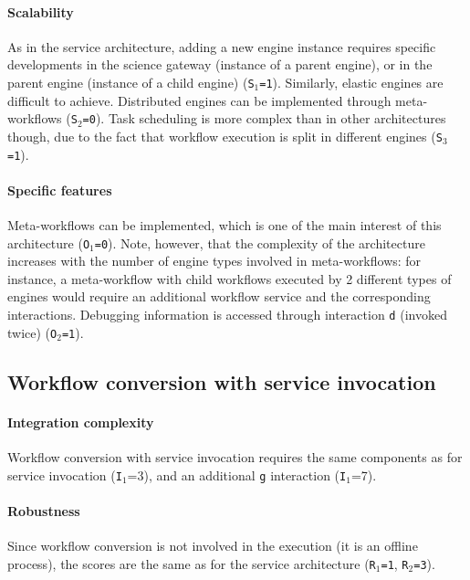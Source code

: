 \documentclass[preprint,3p,twocolumn]{elsarticle}
\begin{document}
\paragraph{Scalability} As in the service architecture, adding a new
engine instance requires specific developments in the science gateway
(instance of a parent engine), or in the parent engine (instance of a
child engine) (\texttt{S$_1$=1}). Similarly, elastic engines are
difficult to achieve. Distributed engines can be implemented through meta-workflows (\texttt{S$_2$=0}). Task scheduling
is more complex than in other architectures though, due to the fact
that workflow execution is split in different engines (\texttt{S$_3$=1}).

\paragraph{Specific features}
Meta-workflows can be implemented, which is one of the main interest
of this architecture (\texttt{O$_1$=0}). Note, however, that the
complexity of the architecture increases with the number of engine
types involved in meta-workflows: for instance, a meta-workflow with
child workflows executed by 2 different types of engines would require an
additional workflow service and the corresponding interactions.
Debugging information is accessed through interaction \texttt{d} (invoked twice) (\texttt{O$_2$=1}).

\subsection{Workflow conversion with service invocation}

\paragraph{Integration complexity} Workflow conversion with service invocation
requires the same components as for service invocation
(\texttt{I$_1$}=3), and an additional \texttt{g} interaction (\texttt{I$_1$}=7).

\paragraph{Robustness} Since workflow conversion is not involved in
the execution (it is an offline process), the scores are the same as for the
service architecture (\texttt{R$_1$=1}, \texttt{R$_2$=3}).
\end{document}
